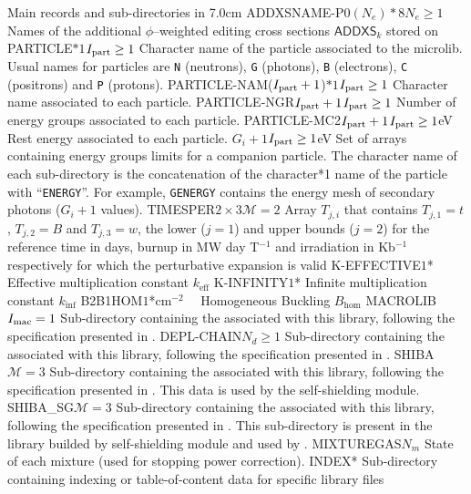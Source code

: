 \begin{DescriptionEnregistrement}{Main records and sub-directories in }{7.0cm}
\OptCharEnr
  {ADDXSNAME-P0}{$(N_{e})*8$}{$N_{e}\ge 1$}
  {Names of the additional $\phi$--weighted editing cross sections $\mathsf{ADDXS}_{k}$ stored on }
\OptCharEnr
  {PARTICLE}{$*1$}{$I_{\rm part}\ge 1$} 
  {Character name of the particle associated to the microlib. Usual names for
  particles are {\tt N} (neutrons), {\tt G} (photons), {\tt B} (electrons),
  {\tt C} (positrons) and {\tt P} (protons).}
\OptCharEnr
  {PARTICLE-NAM}{($I_{\rm part}+1$)$*1$}{$I_{\rm part}\ge 1$} 
  {Character name associated to each particle.}
\OptIntEnr
  {PARTICLE-NGR}{$I_{\rm part}+1$}{$I_{\rm part}\ge 1$}
  {Number of energy groups associated to each particle.}
\OptRealEnr
  {PARTICLE-MC2}{$I_{\rm part}+1$}{$I_{\rm part}\ge 1$}{eV}
  {Rest energy associated to each particle.}
\OptRealVar
  {}{$G_i+1$}{$I_{\rm part}\ge 1$}{eV}
  {Set of arrays containing energy groups limits for a companion particle. The character name
  of each sub-directory is the concatenation of the character*1 name of the particle with ``{\tt ENERGY}''.
  For example, {\tt GENERGY} contains the energy mesh of secondary photons ($G_i+1$ values).}
\OptRealEnr
  {TIMESPER}{$2\times 3$}{$\mathcal{M}=2$}{}
  {Array $T_{j,i}$ that contains $T_{j,1}=t$, $T_{j,2}=B$ and $T_{j,3}=w$, the
   lower ($j=1$) and upper bounds ($j=2$) for the reference time in days, burnup
   in MW day T$^{-1}$ and irradiation in Kb$^{-1}$ respectively for which the
   perturbative expansion is valid}
\OptRealEnr
  {K-EFFECTIVE}{$1$}{*}{}
  {Effective multiplication constant $k_{\mathrm{eff}}$}
\OptRealEnr
  {K-INFINITY}{$1$}{*}{}
  {Infinite multiplication constant $k_{\mathrm{inf}}$}
\OptRealEnr
  {B2B1HOM}{$1$}{*}{cm$^{-2}$~~}
  {Homogeneous Buckling $B_{\mathrm{hom}}$}
\OptDirEnr
  {MACROLIB}{$I_{\rm mac} = 1$}
  {Sub-directory containing the  associated with this
  library, following the specification presented in .}
\OptDirEnr
  {DEPL-CHAIN}{$N_{d} \ge 1$}
  {Sub-directory containing the  associated with this library, following
  the specification presented in .}
\OptDirEnr
  {SHIBA}{$\mathcal{M}=3$}
  {Sub-directory containing the  associated with this
  library, following the specification presented in .
  This data is used by the  self-shielding module.}
\OptDirEnr
  {SHIBA\_SG}{$\mathcal{M}=3$}
  {Sub-directory containing the  associated with this
  library, following the specification presented in .
  This sub-directory is present in the library builded by  self-shielding module and used by .}
\IntEnr
  {MIXTUREGAS}{$N_{m}$}
  {State of each mixture (used for stopping power correction).}
\OptDirEnr
  {INDEX}{*}
  {Sub-directory containing indexing or table-of-content data for specific library
  files}
\end{DescriptionEnregistrement}

